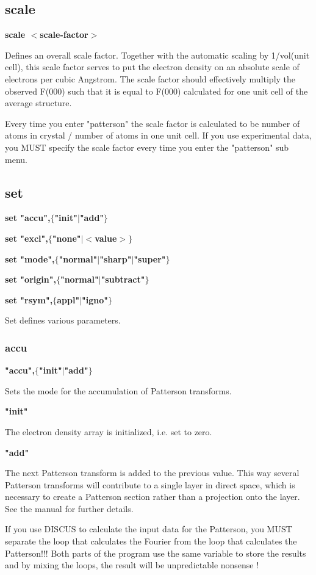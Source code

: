 \subsection*{scale}
{\bf scale $ <$scale-factor$> $ \par }
\par
\vspace{3pt}
Defines an overall scale factor. Together with the automatic scaling 
by 1/vol(unit cell), this scale factor serves to put the electron 
density on an absolute scale of electrons per cubic Angstrom. The 
scale factor should effectively multiply the observed F(000) such that 
it is equal to F(000) calculated for one unit cell of the average 
structure. 
\par
Every time you enter "patterson" the scale factor is calculated to be 
number of atoms in crystal / number of atoms in one unit cell. If you 
use experimental data, you MUST specify the scale factor every time you 
enter the "patterson" sub menu. 
\subsection*{set}
{\bf set "accu",$ \{$"init"$| $"add"$\} $ \par }
{\bf set "excl",$ \{$"none"$| $$ <$value$> $$\} $ \par }
{\bf set "mode",$ \{$"normal"$| $"sharp"$| $"super"$\} $ \par }
{\bf set "origin",$ \{$"normal"$| $"subtract"$\} $ \par }
{\bf set "rsym",$ \{$appl"$| $"igno"$\} $ \par }
\par
\vspace{3pt}
Set defines various parameters. 
\par
\subsubsection{accu}
{\bf "accu",$ \{$"init"$| $"add"$\} $ \par }
\par
\vspace{3pt}
Sets the mode for the accumulation of Patterson transforms. 
\par
{\bf "init" \par }
\vspace{3pt}
The electron density array is initialized, i.e. set to zero. 
\par
{\bf "add" \par }
\vspace{3pt}
The next Patterson transform is added to the previous value.  This way 
several Patterson transforms will contribute to a single layer in direct 
space, which is necessary to create a Patterson section rather than a 
projection onto the layer. See the manual for further details. 
\par
If you use DISCUS to calculate the input data for the Patterson, 
you MUST separate the loop that calculates the Fourier from the loop 
that calculates the Patterson!!! Both parts of the program use 
the same variable to store the results and by mixing the loops, the 
result will be unpredictable nonsense ! 
\par
